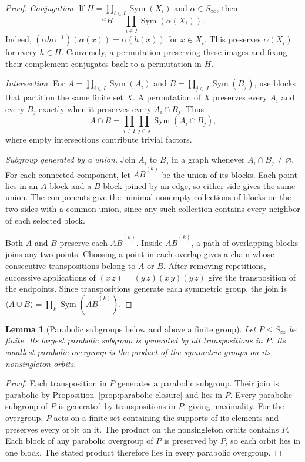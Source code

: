 \documentclass[11pt,a4paper]{article}
\numberwithin{equation}{section}
\newtheorem{lemma}[theorem]{Lemma}
\theoremstyle{definition}
\newcommand{\cg}[2]{{}^{#1}\!#2}
\begin{document}
\begin{proof}
\emph{Conjugation.}
If \(H=\prod_{i\in I}\operatorname{Sym}(X_i)\) and \(\alpha\in S_\infty\), then
\[
 \cg{\alpha}{H}=\prod_{i\in I}\operatorname{Sym}(\alpha(X_i)).
\]
Indeed, \((\alpha h\alpha^{-1})(\alpha(x))=\alpha(h(x))\) for \(x\in X_i\).
This preserves \(\alpha(X_i)\) for every \(h\in H\). Conversely, a
permutation preserving these images and fixing their complement
conjugates back to a permutation in \(H\).

\emph{Intersection.}
For \(A=\prod_{i\in I}\operatorname{Sym}(A_i)\) and
\(B=\prod_{j\in J}\operatorname{Sym}(B_j)\), use blocks that partition the same
finite set \(X\). A permutation of \(X\) preserves every \(A_i\) and
every \(B_j\) exactly when it preserves every \(A_i\cap B_j\).
Thus
\[
 A\cap B=\prod_{i\in I}\prod_{j\in J}\operatorname{Sym}(A_i\cap B_j),
\]
where empty intersections contribute trivial factors.

\emph{Subgroup generated by a union.}
Join \(A_i\) to \(B_j\) in a graph whenever \(A_i\cap B_j\ne\varnothing\).
For each connected component, let \(\widetilde{AB}^{(k)}\) be the
union of its blocks. Each point lies in an \(A\)-block and a \(B\)-block
joined by an edge, so either side gives the same union. The components give the
minimal nonempty collections of blocks on the two sides with a
common union, since any such collection contains every neighbor of
each selected block.

Both \(A\) and \(B\) preserve each \(\widetilde{AB}^{(k)}\). Inside \(\widetilde{AB}^{(k)}\), a path of
overlapping blocks joins any two points. Choosing a point in each
overlap gives a chain whose consecutive transpositions belong to
\(A\) or \(B\). After removing repetitions, successive applications of
\((x\,z)=(y\,z)(x\,y)(y\,z)\) give the transposition of the endpoints.
Since transpositions generate each symmetric group, the join is
\(\langle A\cup B\rangle=\prod_k\operatorname{Sym}(\widetilde{AB}^{(k)})\).
\end{proof}

\begin{lemma}[Parabolic subgroups below and above a finite group]\label{lem:extremal-parabolics}
Let \(P\le S_\infty\) be finite. Its largest parabolic subgroup is
generated by all transpositions in \(P\). Its smallest parabolic
overgroup is the product of the symmetric groups on its
nonsingleton orbits.
\end{lemma}

\begin{proof}
Each transposition in \(P\) generates a parabolic subgroup. Their
join is parabolic by Proposition~\ref{prop:parabolic-closure} and
lies in \(P\). Every parabolic subgroup of \(P\) is generated by
transpositions in \(P\), giving maximality.
For the overgroup, \(P\) acts on a finite set containing the supports
of its elements and preserves every orbit on it. The product on
the nonsingleton orbits contains \(P\). Each block of any parabolic
overgroup of \(P\) is preserved by \(P\), so each orbit lies in one
block. The stated product therefore lies in every parabolic overgroup.
\end{proof}
\end{document}
